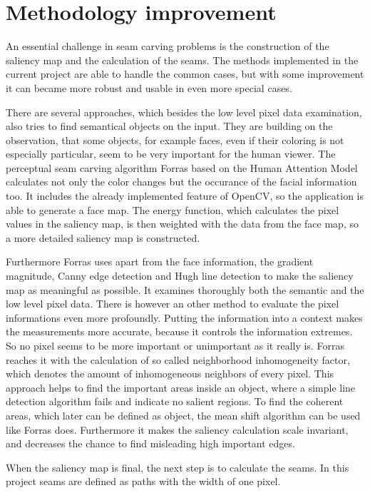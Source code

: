 \documentclass[draft,final]{vutinfth} %
\begin{document}
\section{Methodology improvement}
An essential challenge in seam carving problems is the construction of the saliency map and the calculation of the seams. 
The methods implemented in the current project are able to handle the common cases, but with some improvement it can became more robust and usable in even more special cases.\par 
There are several approaches, which besides the low level pixel data examination, also tries to find semantical objects on the input.
They are building on the observation, that some objects, for example faces, even if their coloring is not especially particular, seem to be very important for the human viewer.
The perceptual seam carving algorithm Forras based on the Human Attention Model calculates not only the color changes but the occurance of the facial information too.
It includes the already implemented feature of OpenCV, so the application is able to generate a face map.
The energy function, which calculates the pixel values in the saliency map, is then weighted with the data from the face map, so a more detailed saliency map is constructed.\par 
Furthermore Forras uses apart from the face information, the gradient magnitude, Canny edge detection and Hugh line detection to make the saliency map as meaningful as possible. 
It examines thoroughly both the semantic and the low level pixel data.
There is however an other method to evaluate the pixel informations even more profoundly.
Putting the information into a context makes the measurements more accurate, because it controls the information extremes.
So no pixel seems to be more important or unimportant as it really is.
Forras reaches it with the calculation of so called neighborhood inhomogeneity factor, which denotes the amount of inhomogeneous neighbors of every pixel. 
This approach helps to find the important areas inside an object, where a simple line detection algorithm fails and indicate no salient regions.
To find the coherent areas, which later can be defined as object, the mean shift algorithm can be used like Forras does. 
Furthermore it makes the saliency calculation scale invariant, and decreases the chance to find misleading high important edges.\par 
When the saliency map is final, the next step is to calculate the seams.
In this project seams are defined as paths with the width of one pixel.
\end{document}
